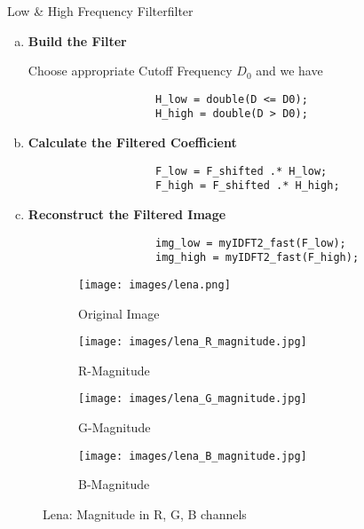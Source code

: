 \begin{problem}{Low \& High Frequency Filter}{filter}

\begin{enumerate}[(a)]
    \item \textbf{Build the Filter}
    
        Choose appropriate Cutoff Frequency $D_0$ and we have \begin{verbatim}
                    H_low = double(D <= D0);
                    H_high = double(D > D0);
        \end{verbatim}

    
    
    \item \textbf{Calculate the Filtered Coefficient}
        \begin{verbatim}
                    F_low = F_shifted .* H_low;
                    F_high = F_shifted .* H_high;
        \end{verbatim}
    \item \textbf{Reconstruct the Filtered Image}
        \begin{verbatim}
                    img_low = myIDFT2_fast(F_low);
                    img_high = myIDFT2_fast(F_high);
        \end{verbatim}
\end{enumerate}
\end{problem}

\begin{figure}[htbp]
    \centering 
    \begin{minipage}{0.8\textwidth} 
        \centering 
        
        \begin{subfigure}[b]{0.45\linewidth} 
            \texttt{[image: images/lena.png]}
            \caption{Original Image}
        \end{subfigure}
        \hfill
        \begin{subfigure}[b]{0.45\linewidth}
            \texttt{[image: images/lena\_R\_magnitude.jpg]}
            \caption{R-Magnitude}
        \end{subfigure}

        \vspace{0.5cm}
        \begin{subfigure}[b]{0.45\linewidth}
            \texttt{[image: images/lena\_G\_magnitude.jpg]}
            \caption{G-Magnitude}
        \end{subfigure}
        \hfill
        \begin{subfigure}[b]{0.45\linewidth}
            \texttt{[image: images/lena\_B\_magnitude.jpg]}
            \caption{B-Magnitude}
        \end{subfigure}

        \caption{Lena: Magnitude in R, G, B channels}
        \label{fig:lena}
    \end{minipage}
\end{figure}

